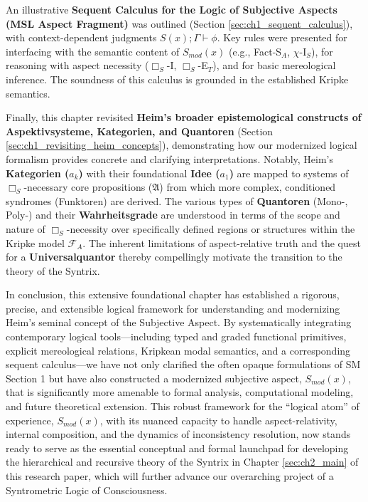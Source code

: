 \documentclass[
    12pt,              %
    a4paper,           %
    headings=normal,   %
    twoside=true,      %
    BCOR=8mm,          %
]{scrbook}
\newcommand{\q}[1]{\enquote{#1}}
\newcommand{\conceptualsyndrome}{a}
\newcommand{\BoxS}{\Box_S}
\begin{document}
An illustrative \textbf{Sequent Calculus for the Logic of Subjective Aspects (MSL Aspect Fragment)} was outlined (Section \ref{sec:ch1_sequent_calculus}), with context-dependent judgments \(S(x); \Gamma \vdash \phi\). Key rules were presented for interfacing with the semantic content of \(S_{mod}(x)\) (e.g., Fact-S\(_A\), \(\chi\)-I\(_S\)), for reasoning with aspect necessity (\(\BoxS\)-I, \(\BoxS\)-E\(_T\)), and for basic mereological inference. The soundness of this calculus is grounded in the established Kripke semantics.

Finally, this chapter revisited \textbf{Heim's broader epistemological constructs of Aspektivsysteme, Kategorien, and Quantoren} (Section \ref{sec:ch1_revisiting_heim_concepts}), demonstrating how our modernized logical formalism provides concrete and clarifying interpretations. Notably, Heim's \textbf{Kategorien (\(\conceptualsyndrome_k\))} with their foundational \textbf{Idee (\(\conceptualsyndrome_1\))} are mapped to systems of \(\BoxS\)-necessary core propositions (\(\mathfrak{A}\)) from which more complex, conditioned syndromes (Funktoren) are derived. The various types of \textbf{Quantoren} (Mono-, Poly-) and their \textbf{Wahrheitsgrade} are understood in terms of the scope and nature of \(\BoxS\)-necessity over specifically defined regions or structures within the Kripke model \(\mathcal{F}_A\). The inherent limitations of aspect-relative truth and the quest for a \textbf{Universalquantor} thereby compellingly motivate the transition to the theory of the Syntrix.

In conclusion, this extensive foundational chapter has established a rigorous, precise, and extensible logical framework for understanding and modernizing Heim's seminal concept of the Subjective Aspect. By systematically integrating contemporary logical tools—including typed and graded functional primitives, explicit mereological relations, Kripkean modal semantics, and a corresponding sequent calculus—we have not only clarified the often opaque formulations of SM Section 1 but have also constructed a modernized subjective aspect, \(S_{mod}(x)\), that is significantly more amenable to formal analysis, computational modeling, and future theoretical extension. This robust framework for the \q{logical atom} of experience, \(S_{mod}(x)\), with its nuanced capacity to handle aspect-relativity, internal composition, and the dynamics of inconsistency resolution, now stands ready to serve as the essential conceptual and formal launchpad for developing the hierarchical and recursive theory of the Syntrix in Chapter \ref{sec:ch2_main} of this research paper, which will further advance our overarching project of a Syntrometric Logic of Consciousness.
\end{document}
